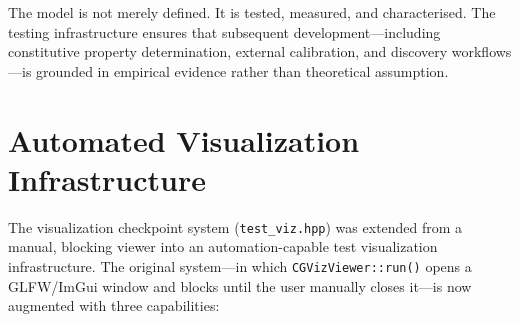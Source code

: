 \documentclass[11pt]{article}
\newcommand{\file}[1]{\texttt{#1}}
\newcommand{\fn}[1]{\texttt{#1}}
\begin{document}
The model is not merely defined.  It is tested, measured, and
characterised.  The testing infrastructure ensures that subsequent
development---including constitutive property determination, external
calibration, and discovery workflows---is grounded in empirical evidence
rather than theoretical assumption.

\section{Automated Visualization Infrastructure}
\label{sec:automated-viz}

The visualization checkpoint system (\file{test\_viz.hpp}) was extended
from a manual, blocking viewer into an automation-capable test
visualization infrastructure.  The original system---in which
\fn{CGVizViewer::run()} opens a GLFW/ImGui window and blocks until the
user manually closes it---is now augmented with three capabilities:
\end{document}
